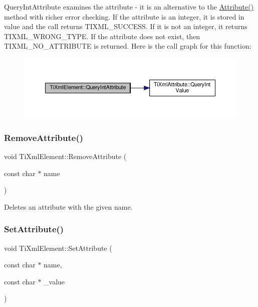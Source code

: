 Query\+Int\+Attribute examines the attribute -\/ it is an alternative to the \hyperlink{classTiXmlElement_a6042f518748f475a7ac4b4e0b509eb05}{Attribute()} method with richer error checking. If the attribute is an integer, it is stored in \textquotesingle{}value\textquotesingle{} and the call returns T\+I\+X\+M\+L\+\_\+\+S\+U\+C\+C\+E\+SS. If it is not an integer, it returns T\+I\+X\+M\+L\+\_\+\+W\+R\+O\+N\+G\+\_\+\+T\+Y\+PE. If the attribute does not exist, then T\+I\+X\+M\+L\+\_\+\+N\+O\+\_\+\+A\+T\+T\+R\+I\+B\+U\+TE is returned. Here is the call graph for this function\+:
\nopagebreak
\begin{figure}[H]
\begin{center}
\leavevmode
\includegraphics[width=350pt]{classTiXmlElement_a5c0f739e0f6f5905a201364532e54a60_cgraph}
\end{center}
\end{figure}
\mbox{\label{classTiXmlElement_a56979767deca794376b1dfa69a525b2a}} 
\subsubsection{\texorpdfstring{Remove\+Attribute()}{RemoveAttribute()}}
{\footnotesize\ttfamily void Ti\+Xml\+Element\+::\+Remove\+Attribute (\begin{DoxyParamCaption}\item[{const char $\ast$}]{name }\end{DoxyParamCaption})}

Deletes an attribute with the given name. \mbox{\label{classTiXmlElement_abf0b3bd7f0e4c746a89ec6e7f101fc32}} 
\subsubsection{\texorpdfstring{Set\+Attribute()}{SetAttribute()}\hspace{0.1cm}{\footnotesize\ttfamily [1/2]}}
{\footnotesize\ttfamily void Ti\+Xml\+Element\+::\+Set\+Attribute (\begin{DoxyParamCaption}\item[{const char $\ast$}]{name,  }\item[{const char $\ast$}]{\+\_\+value }\end{DoxyParamCaption})}

